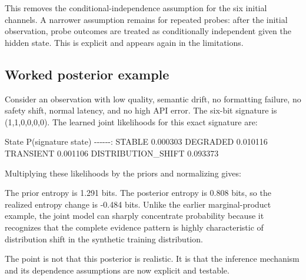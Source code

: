 \documentclass{article}
\begin{document}
This removes the conditional-independence assumption for the six initial channels. A narrower assumption remains for repeated probes: after the initial observation, probe outcomes are treated as conditionally independent given the hidden state. This is explicit and appears again in the limitations.

\subsection{Worked posterior example}

Consider an observation with low quality, semantic drift, no formatting failure, no safety shift, normal latency, and no high API error. The six-bit signature is (1,1,0,0,0,0). The learned joint likelihoods for this exact signature are:

\textbar{} State \textbar{} P(signature \textbar{} state) \textbar{} \textbar-\/-\/-\textbar-\/-\/-:\textbar{} \textbar{} STABLE \textbar{} 0.000303 \textbar{} \textbar{} DEGRADED \textbar{} 0.010116 \textbar{} \textbar{} TRANSIENT \textbar{} 0.001106 \textbar{} \textbar{} DISTRIBUTION\_SHIFT \textbar{} 0.093373 \textbar{}

Multiplying these likelihoods by the priors and normalizing gives:

\begin{table}[t]
\centering
\scriptsize
{}
\caption{Posterior for the worked joint-evidence example.}
\end{table}


The prior entropy is 1.291 bits. The posterior entropy is 0.808 bits, so the realized entropy change is -0.484 bits. Unlike the earlier marginal-product example, the joint model can sharply concentrate probability because it recognizes that the complete evidence pattern is highly characteristic of distribution shift in the synthetic training distribution.

The point is not that this posterior is realistic. It is that the inference mechanism and its dependence assumptions are now explicit and testable.
\end{document}

